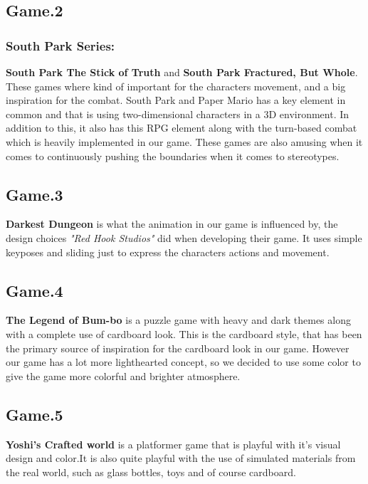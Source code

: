 \subsection{Game.2}
\label{sec:SouthParks}

\subsubsection{South Park Series:}

\textbf{South Park The Stick of Truth} and \textbf{South Park Fractured, But Whole}.
These games where kind of important for the characters movement, and a big inspiration for the combat. South Park and Paper Mario has a key element in common and that is using two-dimensional characters in a 3D environment. In addition to this, it also has this RPG element along with the turn-based combat which is heavily implemented in our game. These games are also amusing when it comes to continuously pushing the boundaries when it comes to stereotypes.   
\cite{SouthPark1}
\cite{SouthPark2}

\subsection{Game.3}
\label{sec:darkestDungeon}
\textbf{Darkest Dungeon} is what the animation in our game is influenced by, the design choices \textit{"Red Hook Studios"} did when developing their game. It uses simple keyposes and sliding just to express the characters actions and movement.
\cite{DarkestDungeon}

\subsection{Game.4}
\textbf{The Legend of Bum-bo} is a puzzle game with heavy and dark themes along with a complete use of cardboard look. This is the cardboard style, that has been the primary source of  inspiration for the cardboard look in our game. However our game has a lot more lighthearted concept, so we decided to use some color to give the game more colorful and brighter atmosphere.
\cite{LegendOfBumbo}

\subsection{Game.5}
\textbf{Yoshi's Crafted world} is a platformer game that is playful with it's visual design and color.It is also quite playful with the use of simulated materials from the real world, such as glass bottles, toys and of course cardboard. 
\cite{YoshisCraftedWorld}

